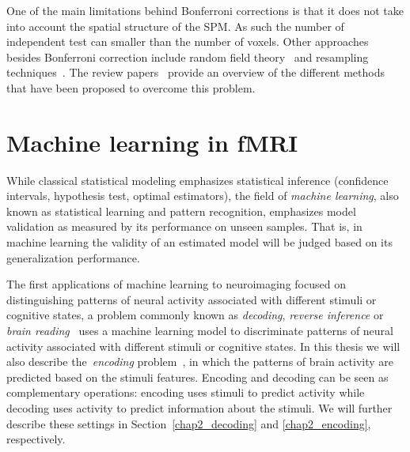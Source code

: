 One of the main limitations behind Bonferroni corrections is that it does not take into account the spatial structure of the SPM. As such the number of independent test can smaller than the number of voxels. 
Other approaches besides Bonferroni correction include random field theory~\citep{friston1994assessing, worsley1992three} and resampling techniques~\citep{Friman2005859, holmes2003bootstrapping}. The review papers~\citep{Logan200495, Nichols2012811} provide an overview of the different methods that have been proposed to overcome this problem.



\section{Machine learning in fMRI}



While classical statistical modeling emphasizes statistical inference (confidence intervals, hypothesis test, optimal estimators), the field of \emph{machine learning}, also known as statistical learning and pattern recognition, emphasizes model validation as measured by its performance on unseen samples. That is, in machine learning the validity of an estimated model will be judged based on its generalization performance. 

The first applications of machine learning to neuroimaging focused on distinguishing patterns of neural activity associated with different stimuli or cognitive states, a problem commonly known as \emph{\gls{decoding}}, \emph{reverse inference} or \emph{brain reading}~\citep{dehaene1998inferring, cox2003,laconte2005support, thirion2006, Sutao2011} uses a machine learning model to discriminate patterns of neural activity associated with different stimuli or cognitive states. In this thesis we will also  describe the~\emph{encoding} problem~\citep{thirion2006, Kay2008, mitchell2008predicting}, in which the patterns of brain activity are predicted based on the stimuli features. Encoding and decoding can be seen as complementary operations: encoding uses stimuli to predict activity while decoding uses activity to predict information about the stimuli. We will further describe these settings in Section~\ref{chap2_decoding} and \ref{chap2_encoding}, respectively.


